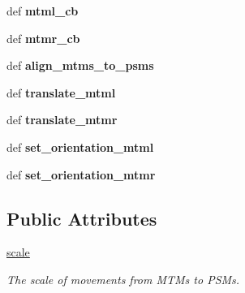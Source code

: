 \begin{DoxyCompactItemize}
\item 
\hypertarget{classcamera__control__node_1_1Teleop__class_ac8a7680ce69f81ca11e07f99f1a0874d}{def {\bfseries mtml\-\_\-cb}}\label{classcamera__control__node_1_1Teleop__class_ac8a7680ce69f81ca11e07f99f1a0874d}

\item 
\hypertarget{classcamera__control__node_1_1Teleop__class_a50e7d80c0353da04ccc115d60b1520a0}{def {\bfseries mtmr\-\_\-cb}}\label{classcamera__control__node_1_1Teleop__class_a50e7d80c0353da04ccc115d60b1520a0}

\item 
\hypertarget{classcamera__control__node_1_1Teleop__class_aed24d9e58e3f8b47ed46709c78bdec53}{def {\bfseries align\-\_\-mtms\-\_\-to\-\_\-psms}}\label{classcamera__control__node_1_1Teleop__class_aed24d9e58e3f8b47ed46709c78bdec53}

\item 
\hypertarget{classcamera__control__node_1_1Teleop__class_ac8a344742544b4ffa6657ce05fbcad55}{def {\bfseries translate\-\_\-mtml}}\label{classcamera__control__node_1_1Teleop__class_ac8a344742544b4ffa6657ce05fbcad55}

\item 
\hypertarget{classcamera__control__node_1_1Teleop__class_a912e9563690f22f70b0f6a1393af950a}{def {\bfseries translate\-\_\-mtmr}}\label{classcamera__control__node_1_1Teleop__class_a912e9563690f22f70b0f6a1393af950a}

\item 
\hypertarget{classcamera__control__node_1_1Teleop__class_adf5e656e7810c59bc661617508ea62fd}{def {\bfseries set\-\_\-orientation\-\_\-mtml}}\label{classcamera__control__node_1_1Teleop__class_adf5e656e7810c59bc661617508ea62fd}

\item 
\hypertarget{classcamera__control__node_1_1Teleop__class_a6f774400c4995a2a6a28c67c415f0562}{def {\bfseries set\-\_\-orientation\-\_\-mtmr}}\label{classcamera__control__node_1_1Teleop__class_a6f774400c4995a2a6a28c67c415f0562}

\end{DoxyCompactItemize}
\subsection*{Public Attributes}
\begin{DoxyCompactItemize}
\item 
\hypertarget{classcamera__control__node_1_1Teleop__class_abb206f73fc0f76fa869f6e27d62bc728}{\hyperlink{classcamera__control__node_1_1Teleop__class_abb206f73fc0f76fa869f6e27d62bc728}{scale}}\label{classcamera__control__node_1_1Teleop__class_abb206f73fc0f76fa869f6e27d62bc728}

\begin{DoxyCompactList}\small\item\em The scale of movements from M\-T\-Ms to P\-S\-Ms. \end{DoxyCompactList}\end{DoxyCompactItemize}


